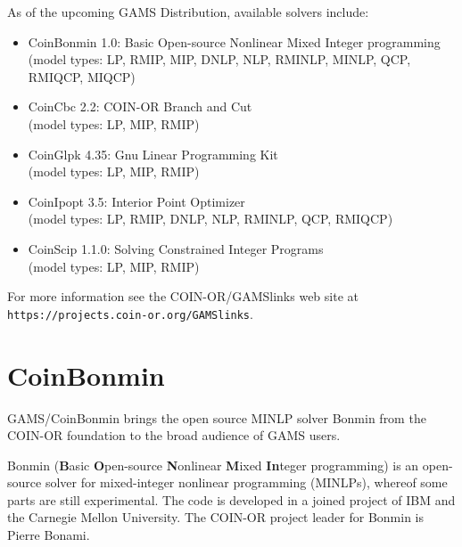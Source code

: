 As of the upcoming GAMS Distribution, available solvers include:
\begin{itemize}
\item CoinBonmin 1.0: Basic Open-source Nonlinear Mixed Integer programming\\
(model types: LP, RMIP, MIP, DNLP, NLP, RMINLP, MINLP, QCP, RMIQCP, MIQCP)
\item CoinCbc 2.2: COIN-OR Branch and Cut\\
(model types: LP, MIP, RMIP)
\item CoinGlpk 4.35: Gnu Linear Programming Kit\\
(model types: LP, MIP, RMIP)
\item CoinIpopt 3.5: Interior Point Optimizer\\
(model types: LP, RMIP, DNLP, NLP, RMINLP, QCP, RMIQCP)
\item CoinScip 1.1.0: Solving Constrained Integer Programs\\
(model types: LP, MIP, RMIP)
\end{itemize}

% 

For more information see the COIN-OR/GAMSlinks web site at
\texttt{https://projects.coin-or.org/GAMSlinks}.

\section{CoinBonmin}

GAMS/CoinBonmin brings the open source MINLP solver Bonmin from the COIN-OR foundation to the broad audience of GAMS users.

Bonmin (\textbf{B}asic \textbf{O}pen-source \textbf{N}onlinear \textbf{M}ixed \textbf{In}teger programming) is an open-source solver for mixed-integer nonlinear programming (MINLPs), whereof some parts are still experimental.
The code is developed in a joined project of IBM and the Carnegie Mellon University.
The COIN-OR project leader for Bonmin is Pierre Bonami.

